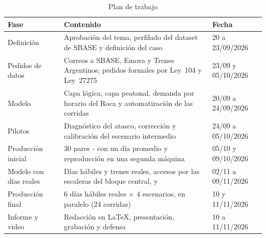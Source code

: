 \begin{table}[H]
\centering
\caption{Plan de trabajo}
\label{tab:plan}
\small
\begin{tabularx}{\textwidth}{@{}l X l@{}}
\toprule
Fase & Contenido & Fecha \\
\midrule
Definición & Aprobación del tema, perfilado del dataset de SBASE y definición del caso & 20 a 23/09/2026 \\
Pedidos de datos & Correos a SBASE, Emova y Trenes Argentinos; pedidos formales por Ley~104 y Ley~\num{27275} & 23/09 y 05/10/2026 \\
Modelo & Capa lógica, capa peatonal, demanda por horario del Roca y automatización de las corridas & 20/09 a 24/09/2026 \\
Pilotos & Diagnóstico del atasco, corrección y calibración del escenario intermedio & 24/09 a 05/10/2026 \\
Producción inicial & 30 pares \EO{}-\EI{} con un día promedio y reproducción en una segunda máquina & 05/10 y 09/10/2026 \\
Modelo con días reales & Días hábiles y trenes reales, accesos por las escaleras del bloque central, \ET{} y \EIT{} & 02/11 a 09/11/2026 \\
Producción final & 6 días hábiles reales $\times$ 4 escenarios, en paralelo (24 corridas) & 10 y 11/11/2026 \\
Informe y video & Redacción en \LaTeX{}, presentación, grabación y defensa & 10 a 11/11/2026 \\
\bottomrule
\end{tabularx}
\end{table}
